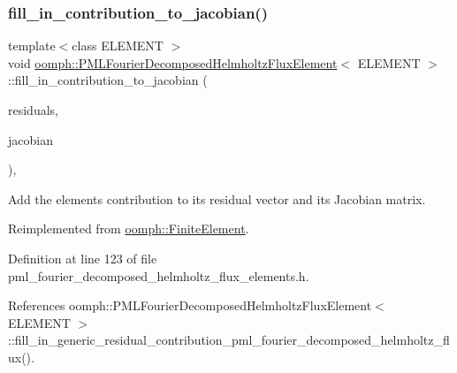 \subsubsection{\texorpdfstring{fill\+\_\+in\+\_\+contribution\+\_\+to\+\_\+jacobian()}{fill\_in\_contribution\_to\_jacobian()}}
{\footnotesize\ttfamily template$<$class E\+L\+E\+M\+E\+NT $>$ \\
void \hyperlink{classoomph_1_1PMLFourierDecomposedHelmholtzFluxElement}{oomph\+::\+P\+M\+L\+Fourier\+Decomposed\+Helmholtz\+Flux\+Element}$<$ E\+L\+E\+M\+E\+NT $>$\+::fill\+\_\+in\+\_\+contribution\+\_\+to\+\_\+jacobian (\begin{DoxyParamCaption}\item[{\hyperlink{classoomph_1_1Vector}{Vector}$<$ double $>$ \&}]{residuals,  }\item[{\hyperlink{classoomph_1_1DenseMatrix}{Dense\+Matrix}$<$ double $>$ \&}]{jacobian }\end{DoxyParamCaption})\hspace{0.3cm}{\ttfamily [inline]}, {\ttfamily [virtual]}}



Add the element\textquotesingle{}s contribution to its residual vector and its Jacobian matrix. 



Reimplemented from \hyperlink{classoomph_1_1FiniteElement_a0ae7af222af38a0d53bf283dc85bdfea}{oomph\+::\+Finite\+Element}.



Definition at line 123 of file pml\+\_\+fourier\+\_\+decomposed\+\_\+helmholtz\+\_\+flux\+\_\+elements.\+h.



References oomph\+::\+P\+M\+L\+Fourier\+Decomposed\+Helmholtz\+Flux\+Element$<$ E\+L\+E\+M\+E\+N\+T $>$\+::fill\+\_\+in\+\_\+generic\+\_\+residual\+\_\+contribution\+\_\+pml\+\_\+fourier\+\_\+decomposed\+\_\+helmholtz\+\_\+flux().

\mbox{\label{classoomph_1_1PMLFourierDecomposedHelmholtzFluxElement_a25de3113d82c48966a78004d5b2bdca6}} 
